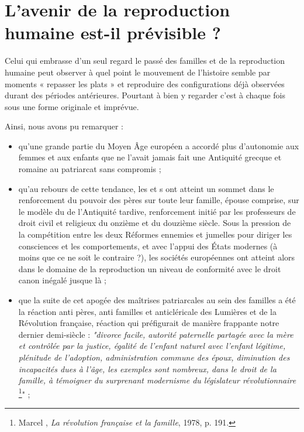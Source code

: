    \section{L'avenir de la reproduction humaine est-il prévisible ?}
 
 Celui qui embrasse d'un seul regard le passé des familles et de la reproduction humaine peut observer à quel point le mouvement de l'histoire semble par moments « repasser les plats » et reproduire des configurations déjà observées durant des périodes antérieures. Pourtant à bien y regarder c'est à chaque fois sous une forme originale et imprévue.  
 
 Ainsi, nous avons pu remarquer : 
\begin{itemize}

\item qu'une grande partie du Moyen Âge européen a accordé plus d'autonomie aux femmes et aux enfants que ne l'avait jamais fait une Antiquité grecque et romaine au patriarcat sans compromis ;

\item qu'au rebours de cette tendance, les  et s ont atteint un sommet dans le renforcement du pouvoir des pères sur toute leur famille, épouse comprise, sur le modèle du  de l'Antiquité tardive, renforcement initié par les professeurs de droit civil et religieux du onzième et du douzième siècle. Sous la pression de la compétition entre les deux Réformes ennemies et jumelles pour diriger les consciences et les comportements, et avec l'appui des États modernes (à moins que ce ne soit le contraire ?), les sociétés européennes ont atteint alors dans le domaine de la reproduction un niveau de conformité avec le droit canon inégalé jusque là ;

\item que la suite de cet apogée des maîtrises patriarcales au sein des familles a été la réaction anti pères, anti familles et anticléricale des Lumières et de la Révolution française, réaction qui préfigurait de manière frappante notre dernier demi-siècle : \emph{"divorce facile, autorité paternelle partagée avec la mère et contrôlée par la justice, égalité de l'enfant naturel avec l'enfant légitime, plénitude de l'adoption, administration commune des époux, diminution des incapacités dues à l'âge, les exemples sont nombreux, dans le droit de la famille, à témoigner du surprenant modernisme du législateur révolutionnaire}
\footnote{Marcel , \emph{La révolution française et la famille}, 1978, p. 191.}" ;


\end{itemize}
